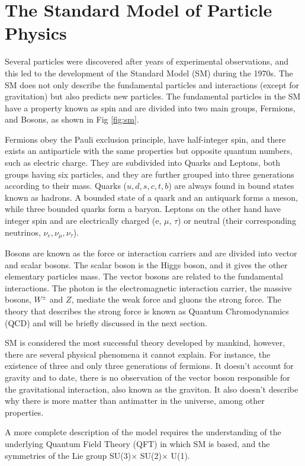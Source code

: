 \chapter{\leavevmode\newline The Standard Model of Particle Physics}
\label{chap:chapter_1}
Several particles were discovered after years of experimental observations, and this led to the development of the Standard Model (SM) during the 1970s. The SM does not only describe the fundamental particles and interactions (except for gravitation) but also predicts new particles. The fundamental particles in the SM have a property known as spin and are divided into two main groups, Fermions, and Bosons, as shown in Fig \ref{fig:sm}.

Fermions obey the Pauli exclusion principle, have half-integer spin, and there exists an antiparticle with the same properties but opposite quantum numbers, such as electric charge. They are subdivided into Quarks and Leptons, both groups having six particles, and they are further grouped into three generations according to their mass. Quarks ($u, d, s, c, t, b$) are always found in bound states known as hadrons. A bounded state of a quark and an antiquark forms a meson, while three bounded quarks form a baryon. Leptons on the other hand have integer spin and are electrically charged (e, $\mu$, $\tau$) or neutral (their corresponding neutrinos, $\nu_e, \nu_\mu, \nu_\tau$).

Bosons are known as the force or interaction carriers and are divided into vector and scalar bosons. The scalar boson is the Higgs boson, and it gives the other elementary particles mass. The vector bosons are related to the fundamental interactions. The photon is the electromagnetic interaction carrier, the massive bosons, $W^{\pm}$ and $Z$, mediate the weak force and gluons the strong force. The theory that describes the strong force is known as Quantum Chromodynamics (QCD) and will be briefly discussed in the next section.

SM is considered the most successful theory developed by mankind, however, there are several physical phenomena it cannot explain. For instance, the existence of three and only three generations of fermions. It doesn't account for gravity and to date, there is no observation of the vector boson responsible for the gravitational interaction, also known as the graviton. It also doesn't describe why there is more matter than antimatter in the universe, among other properties.

A more complete description of the model requires the understanding of the underlying Quantum Field Theory (QFT) in which SM is based, and the symmetries of the Lie group SU(3)$ \times$ SU(2)$ \times$ U(1).

